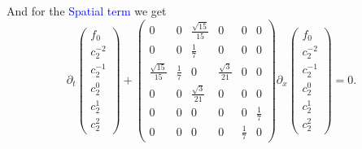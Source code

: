 \begin{frame}
	\scriptsize
	And for the \textcolor{blue}{Spatial term} we get
		$$
	\partial_t \left(\begin{array}{c}
		f_0 \\
		c_2^{-2} \\
		c_2^{-1} \\
		c_2^0 \\
		c_2^1 \\
		c_2^2
	\end{array}\right) + \begin{pmatrix}
		0 & 0 & \frac{\sqrt{15}}{15} & 0 & 0 & 0 \\
		0 & 0 & \frac{1}{7} & 0 & 0 & 0 \\
		\frac{\sqrt{15}}{15} & \frac{1}{7} & 0 & \frac{\sqrt{3}}{21} & 0 &  0 \\
		0 & 0 & \frac{\sqrt{3}}{21} & 0 & 0 & 0 \\
		0 & 0 & 0 & 0 & 0 & \frac{1}{7}\\
		0 & 0 & 0 & 0 & \frac{1}{7} & 0
	\end{pmatrix} \partial_x \left(\begin{array}{c}
		f_0 \\
		c_2^{-2} \\
		c_2^{-1} \\
		c_2^0 \\
		c_2^1 \\
		c_2^2
	\end{array}\right) = 0.
	$$
\end{frame}


